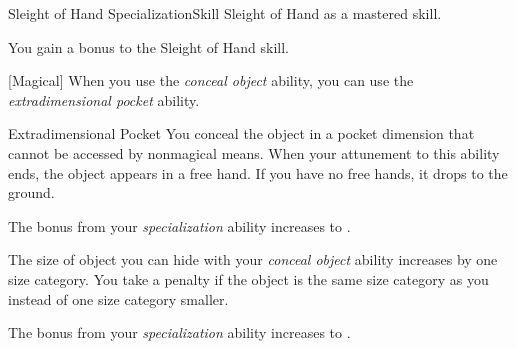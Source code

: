     \begin{feat}{Sleight of Hand Specialization}{Skill}
        \featpre Sleight of Hand as a mastered skill.

         You gain a  bonus to the Sleight of Hand skill.


        [Magical] When you use the \textit{conceal object} ability, you can use the \textit{extradimensional pocket} ability.
        \begin{attuneability}{Extradimensional Pocket}
            \rankline
            You conceal the object in a pocket dimension that cannot be accessed by nonmagical means.
            When your attunement to this ability ends, the object appears in a free hand.
            If you have no free hands, it drops to the ground.
        \end{attuneability}

         The bonus from your \textit{specialization} ability increases to .

         The size of object you can hide with your \textit{conceal object} ability increases by one size category.
        You take a  penalty if the object is the same size category as you instead of one size category smaller.

         The bonus from your \textit{specialization} ability increases to .

    \end{feat}

